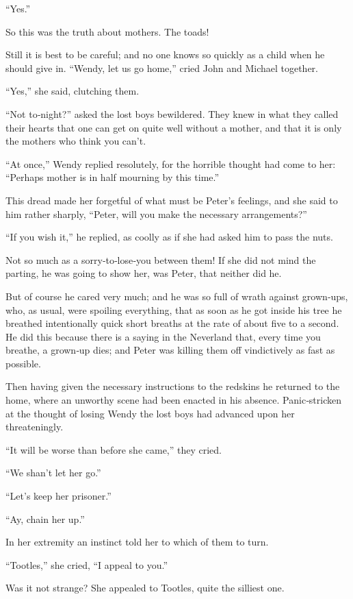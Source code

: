 “Yes.”

So this was the truth about mothers.
The toads!

Still it is best to be careful;
and no one knows so quickly as a child when he should give in.
“Wendy, let us go home,” cried John and Michael together.

“Yes,” she said, clutching them.

“Not to‐night?\@” asked the lost boys bewildered.
They knew in what they called their hearts that one can get on quite well without a mother,
and that it is only the mothers who think you can’t.

“At once,” Wendy replied resolutely,
for the horrible thought had come to her:
“Perhaps mother is in half mourning by this time.”

This dread made her forgetful of what must be Peter’s feelings,
and she said to him rather sharply, “Peter, will you make the necessary arrangements?”

“If you wish it,” he replied, as coolly as if she had asked him to pass the nuts.

Not so much as a sorry‐to‐lose‐you between them!
If she did not mind the parting, he was going to show her, was Peter, that neither did he.

But of course he cared very much;
and he was so full of wrath against grown‐ups,
who, as usual, were spoiling everything,
that as soon as he got inside his tree he breathed intentionally quick short breaths
at the rate of about five to a second.
He did this because there is a saying in the Neverland that, every time you breathe, a grown‐up dies;
and Peter was killing them off vindictively as fast as possible.

Then having given the necessary instructions to the redskins he returned to the home,
where an unworthy scene had been enacted in his absence.
Panic‐stricken at the thought of losing Wendy the lost boys had advanced upon her threateningly.

“It will be worse than before she came,” they cried.

“We shan’t let her go.”

“Let’s keep her prisoner.”

“Ay, chain her up.”

In her extremity an instinct told her to which of them to turn.

“Tootles,” she cried, “I appeal to you.”

Was it not strange?
She appealed to Tootles, quite the silliest one.

